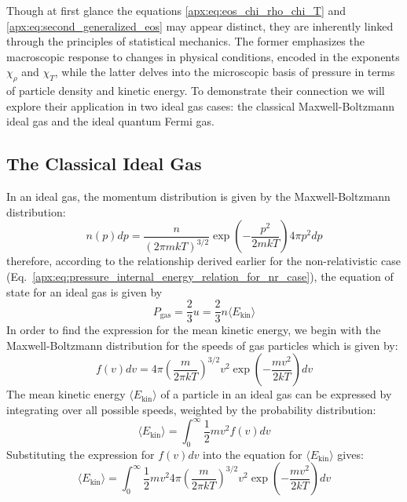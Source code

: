 \documentclass[main.tex]{subfiles}
\begin{document}
Though at first glance the equations \eqref{apx:eq:eos_chi_rho_chi_T} and \eqref{apx:eq:second_generalized_eos} may appear distinct, they are inherently linked through the principles of statistical mechanics. The former emphasizes the macroscopic response to changes in physical conditions, encoded in the exponents $\chi_\rho$ and $\chi_T$, while the latter delves into the microscopic basis of pressure in terms of particle density and kinetic energy. To demonstrate their connection we will explore their application in two ideal gas cases: the classical Maxwell-Boltzmann ideal gas and the ideal quantum Fermi gas.

\subsection{The Classical Ideal Gas}
In an ideal gas, the momentum distribution is given by the Maxwell-Boltzmann distribution:
\begin{equation}
    n(p) dp = \frac{n}{(2\pi m kT)^{3/2}} \exp\left(- \frac{p^2}{2mkT}\right) 4\pi p^2 dp
\end{equation}
therefore, according to the relationship derived earlier for the non-relativistic case (Eq.~\ref{apx:eq:pressure_internal_energy_relation_for_nr_case}), the equation of state for an ideal gas is given by
\begin{equation}\label{apx:eq:pgas}
    P_{\text{gas}} = \frac{2}{3}u = \frac{2}{3} n \langle E_{\text{kin}} \rangle
\end{equation}
In order to find the expression for the mean kinetic energy, we begin with the Maxwell-Boltzmann distribution for the speeds of gas particles which is given by:
\begin{equation*}
    f(v)dv = 4\pi \left( \frac{m}{2\pi kT} \right)^{3/2} v^2 \exp\left(-\frac{mv^2}{2kT}\right)dv
\end{equation*}
The mean kinetic energy $\langle E_{\text{kin}} \rangle$ of a particle in an ideal gas can be expressed by integrating over all possible speeds, weighted by the probability distribution:
\begin{equation*}
    \langle E_{\text{kin}} \rangle = \int_{0}^{\infty} \frac{1}{2} m v^2 f(v) dv
\end{equation*}
Substituting the expression for $f(v)dv$ into the equation for $\langle E_{\text{kin}} \rangle$ gives:
\begin{equation*}
    \langle E_{\text{kin}} \rangle = \int_{0}^{\infty} \frac{1}{2} m v^2 4\pi \left( \frac{m}{2\pi kT} \right)^{3/2} v^2 \exp\left(-\frac{mv^2}{2kT}\right) dv
\end{equation*}
\end{document}
